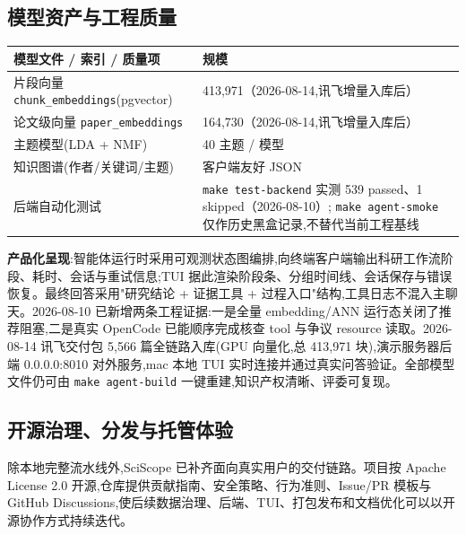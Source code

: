 \subsection{模型资产与工程质量}
\begin{tableblock}
\begin{tabularx}{0.96\textwidth}{p{42mm}X}
\toprule
\textbf{模型文件 / 索引 / 质量项} & \textbf{规模} \\
\midrule
片段向量 \texttt{chunk\_embeddings}(pgvector) & 413{,}971（2026-08-14,讯飞增量入库后） \\
论文级向量 \texttt{paper\_embeddings} & 164{,}730（2026-08-14,讯飞增量入库后） \\
主题模型(LDA + NMF) & 40 主题 / 模型 \\
知识图谱(作者/关键词/主题) & 客户端友好 JSON \\
后端自动化测试 & \texttt{make test-backend} 实测 539 passed、1 skipped（2026-08-10）; \texttt{make agent-smoke} 仅作历史黑盒记录,不替代当前工程基线 \\
\bottomrule
\end{tabularx}
\end{tableblock}
\begin{plainbox}
\textbf{产品化呈现}:智能体运行时采用可观测状态图编排,向终端客户端输出科研工作流阶段、耗时、会话与重试信息;TUI 据此渲染阶段条、分组时间线、会话保存与错误恢复。最终回答采用"研究结论 + 证据工具 + 过程入口"结构,工具日志不混入主聊天。2026-08-10 已新增两条工程证据:一是全量 embedding/ANN 运行态关闭了推荐阻塞,二是真实 OpenCode 已能顺序完成核查 tool 与争议 resource 读取。2026-08-14 讯飞交付包 5{,}566 篇全链路入库(GPU 向量化,总 413{,}971 块),演示服务器后端 0.0.0.0:8010 对外服务,mac 本地 TUI 实时连接并通过真实问答验证。全部模型文件仍可由 \texttt{make agent-build} 一键重建,知识产权清晰、评委可复现。
\end{plainbox}

\subsection{开源治理、分发与托管体验}
除本地完整流水线外,SciScope 已补齐面向真实用户的交付链路。项目按 Apache License 2.0 开源,仓库提供贡献指南、安全策略、行为准则、Issue/PR 模板与 GitHub Discussions,使后续数据治理、后端、TUI、打包发布和文档优化可以以开源协作方式持续迭代。

